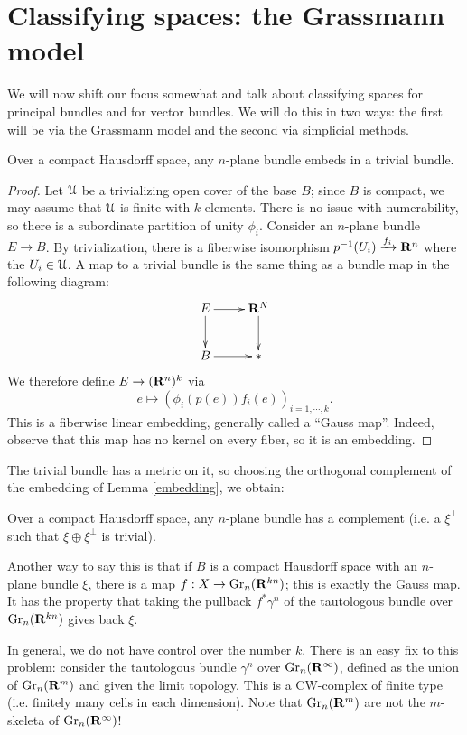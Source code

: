 \section{Classifying spaces: the Grassmann model}\label{grassmannmodel}
We will now shift our focus somewhat and talk about classifying spaces for
principal bundles and for vector bundles. We will do this in two ways: the
first will be via the Grassmann model and the second via simplicial methods.
\begin{lemma}\label{embedding}
    Over a compact Hausdorff space, any $n$-plane bundle embeds in a trivial
    bundle.
\end{lemma}
\begin{proof}
    Let $\mathcal U$ be a trivializing open cover of the base $B$; since $B$ is
    compact, we may assume that $\mathcal U$ is finite with $k$ elements. There is no
    issue with numerability, so there is a subordinate partition of unity $\phi_i$.
    Consider an $n$-plane bundle $E\to B$. By trivialization, there is a
    fiberwise isomorphism $p^{-1}(U_i)\xrightarrow{f_i}\mathbf R^n$ where the $U_i\in
    \mathcal U$. A map to a trivial bundle is the same thing as a bundle map in the
    following diagram:
    \begin{equation*}
	\xymatrix{
	    E\ar[r]\ar[d] & \RR^N\ar[d]\\
	    B\ar[r] & \ast
	    }
    \end{equation*}
    We therefore define $E\to (\mathbf R^n)^k$ via
    $$e\mapsto (\phi_i(p(e))f_i(e))_{i=1,\cdots,k}.$$
    This is a fiberwise linear embedding, generally called a ``Gauss map''.
    Indeed, observe that this map has no kernel on every fiber, so it is an
    embedding.
\end{proof}
The trivial bundle has a metric on it, so choosing the orthogonal complement of
the embedding of Lemma \ref{embedding}, we obtain:
\begin{corollary}
    Over a compact Hausdorff space, any $n$-plane bundle has a complement (i.e.
    a $\xi^\perp$ such that $\xi\oplus\xi^\perp$ is trivial).
\end{corollary}
Another way to say this is that if $B$ is a compact Hausdorff space with an
$n$-plane bundle $\xi$, there is a map $f:X\to\mathrm{Gr}_n(\mathbf R^{kn})$; this is
exactly the Gauss map. It has the property that taking the pullback
$f^\ast\gamma^n$ of the tautologous bundle over $\mathrm{Gr}_n(\mathbf R^{kn})$ gives back
$\xi$. 

In general, we do not have control over the number $k$. There is an easy fix to
this problem: consider the tautologous bundle $\gamma^n$ over
$\mathrm{Gr}_n(\mathbf R^\infty)$, defined as the union of $\mathrm{Gr}_n(\mathbf R^m)$ and given the
limit topology. This is a CW-complex of finite type (i.e. finitely many cells
in each dimension). Note that $\mathrm{Gr}_n(\mathbf R^m)$ are not the $m$-skeleta of
$\mathrm{Gr}_n(\mathbf R^\infty)$!

